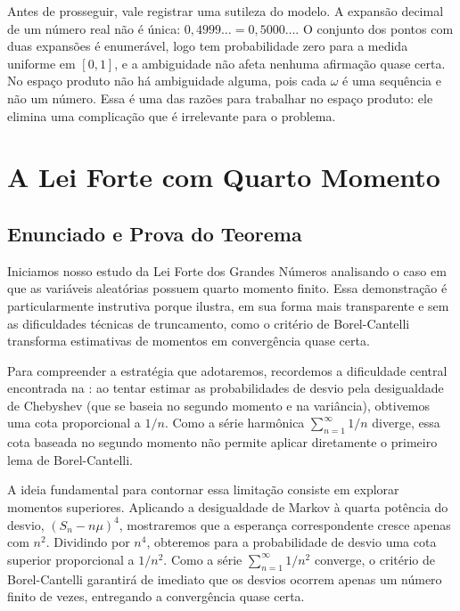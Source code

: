 \documentclass[12pt,portuguese]{article}
\theoremstyle{definition}
\theoremstyle{plainexercise}
\theoremstyle{starredexercise}
\theoremstyle{definition}
\begin{document}
Antes de prosseguir, vale registrar uma sutileza do modelo. A expansão decimal
de um número real não é única: $0{,}4999\ldots=0{,}5000\ldots$. O conjunto dos
pontos com duas expansões é enumerável, logo tem probabilidade zero para a
medida uniforme em $[0,1]$, e a ambiguidade não afeta nenhuma afirmação quase
certa. No espaço produto não há ambiguidade alguma, pois cada $\omega$ é uma
sequência e não um número. Essa é uma das razões para trabalhar no espaço
produto: ele elimina uma complicação que é irrelevante para o problema.

\section{A Lei Forte com Quarto Momento}\label{sec:quarto-momento}

\subsection{Enunciado e Prova do Teorema}\label{subsec:quarto-momento-teorema}

Iniciamos nosso estudo da Lei Forte dos Grandes Números analisando o caso em que
as variáveis aleatórias possuem quarto momento finito. Essa demonstração é
particularmente instrutiva porque ilustra, em sua forma mais transparente e sem
as dificuldades técnicas de truncamento, como o critério de Borel-Cantelli
transforma estimativas de momentos em convergência quase certa.

Para compreender a estratégia que adotaremos, recordemos a dificuldade central
encontrada na : ao tentar estimar as probabilidades
de desvio pela desigualdade de Chebyshev (que se baseia no segundo momento e na
variância), obtivemos uma cota proporcional a $1/n$. Como a série harmônica
$\sum_{n=1}^\infty 1/n$ diverge, essa cota baseada no segundo momento não
permite aplicar diretamente o primeiro lema de Borel-Cantelli.

A ideia fundamental para contornar essa limitação consiste em explorar momentos
superiores. Aplicando a desigualdade de Markov à quarta potência do desvio,
$(S_n-n\mu)^4$, mostraremos que a esperança correspondente cresce apenas com
$n^2$. Dividindo por $n^4$, obteremos para a probabilidade de desvio uma cota
superior proporcional a $1/n^2$. Como a série $\sum_{n=1}^\infty 1/n^2$
converge, o critério de Borel-Cantelli garantirá de imediato que os desvios
ocorrem apenas um número finito de vezes, entregando a convergência quase certa.
\end{document}
